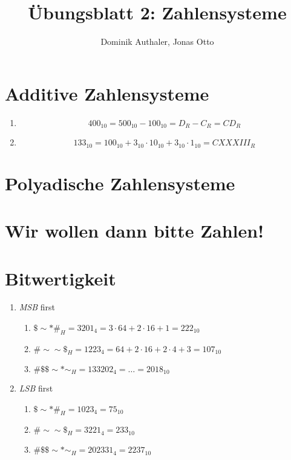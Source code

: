 \documentclass[a4paper]{article}
\author{Dominik Authaler, Jonas Otto}
\title{Übungsblatt 2: Zahlensysteme}
\begin{document}
\maketitle

\section{Additive Zahlensysteme}

\begin{enumerate}[label=\Roman*)]
    \item
        \begin{equation}
            400_{10} = 500_{10} - 100_{10} = D_R - C_R = \textit{CD}_R
        \end{equation}
    \item
        \begin{equation}
            133_{10} = 100_{10} + 3_{10} \cdot 10_{10} + 3_{10} \cdot 1_{10} = \textit{CXXXIII}_R
        \end{equation}
        
\end{enumerate}

\section{Polyadische Zahlensysteme}

\section{Wir wollen dann bitte Zahlen!}

\section{Bitwertigkeit}
\begin{enumerate}[label=\alph*)]
    \item \emph{MSB} first
        \begin{enumerate}[label=\Roman*)]
            \item $ \$\sim*\#_H = 3201_4 = 3 \cdot 64 + 2 \cdot 16 + 1 = 222_{10} $

            \item $ \#\sim\sim\$_H = 1223_4 = 64 + 2 \cdot 16 + 2 \cdot 4 + 3 = 107_{10} $

            \item $ \#\$\$\sim*\sim_H = 133202_4 = \dots = 2018_{10} $
        \end{enumerate}

    \item \emph{LSB} first
        \begin{enumerate}[label=\Roman*)]
            \item $ \$\sim*\#_H = 1023_4 = 75_{10} $

            \item $ \#\sim\sim\$_H = 3221_4 = 233_{10} $

            \item $ \#\$\$\sim*\sim_H = 202331_4 = 2237_{10} $
        \end{enumerate}
\end{enumerate}
\end{document}
